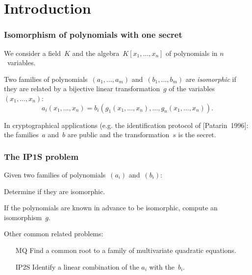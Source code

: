 \documentclass{beamer}%
\begin{document}
\section{Introduction}
\begin{frame}\frametitle{Isomorphism of polynomials with one secret} %

We consider a field~$K$ and the algebra~$K[x_1,…,x_n]$ of polynomials in
$n$~variables.

\begin{definition}
Two families of polynomials~$(a_1, …, a_m)$ and~$(b_1, …, b_m)$
are \emph{isomorphic} if they are related by a
bijective linear transformation~$g$ of the variables~$(x_1, …, x_n)$:
\[ a_i (x_1, …, x_n) = b_i (g_1 (x_1, …, x_n), …, g_n (x_1, …, x_n)). \]
\end{definition}

In cryptographical applications (e.g. the identification protocol of
[Patarin~1996]: the families~$a$ and~$b$ are public and the
transformation~$s$ is the secret.
\end{frame}%
\begin{frame}\frametitle{The IP1S problem}%

\begin{df}
Given two families of polynomials~$(a_i)$ and~$(b_i)$:
\begin{description}[labelwidth=1ex,align=parleft]
\item[Decisional IP1S] Determine if they are isomorphic.
\item[\textbf{Computational IP1S}] If the polynomials are known in
advance to be isomorphic, compute an isomorphism~$g$.
\end{description}
\end{df}

\bigskip
Other common related problems:
\begin{itemize}
\item[MQ] Find a common root to a family of multivariate quadratic
equations.
\item[IP2S] Identify a linear combination of the $a_i$ with the~$b_i$.
\end{itemize}
\end{frame}%
\end{document}
